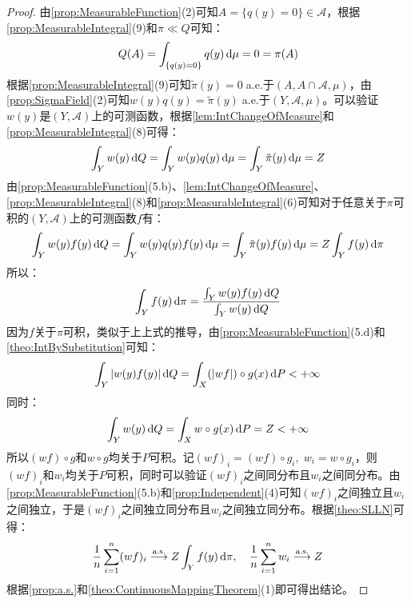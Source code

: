 \begin{proof}
	由\cref{prop:MeasurableFunction}(2)可知$A=\{q(y)=0\}\in\mathscr{A}$，根据\cref{prop:MeasurableIntegral}(9)和$\pi\ll Q$可知：
	\begin{equation*}
		Q(A)=\int_{\{q(y)=0\}}q(y)\mathop{}\!\mathrm{d}\mu=0=\pi(A)
	\end{equation*}
	根据\cref{prop:MeasurableIntegral}(9)可知$\tilde{\pi}(y)=0\;$a.e.于$(A,A\cap\mathscr{A},\mu)$，由\cref{prop:SigmaField}(2)可知$w(y)q(y)=\tilde{\pi}(y)\;$a.e.于$(Y,\mathscr{A},\mu)$。可以验证$w(y)$是$(Y,\mathscr{A})$上的可测函数，根据\cref{lem:IntChangeOfMeasure}和\cref{prop:MeasurableIntegral}(8)可得：
	\begin{equation*}
		\int_{Y}w(y)\mathop{}\!\mathrm{d} Q=\int_{Y}w(y)q(y)\mathop{}\!\mathrm{d}\mu=\int_{Y}\tilde{\pi}(y)\mathop{}\!\mathrm{d}\mu=Z
	\end{equation*}
	由\cref{prop:MeasurableFunction}(5.b)、\cref{lem:IntChangeOfMeasure}、\cref{prop:MeasurableIntegral}(8)和\cref{prop:MeasurableIntegral}(6)可知对于任意关于$\pi$可积的$(Y,\mathscr{A})$上的可测函数$f$有：
	\begin{equation*}
		\int_{Y}w(y)f(y)\mathop{}\!\mathrm{d} Q=\int_{Y}w(y)q(y)f(y)\mathop{}\!\mathrm{d}\mu=\int_{Y}\tilde{\pi}(y)f(y)\mathop{}\!\mathrm{d}\mu=Z\int_{Y}f(y)\mathop{}\!\mathrm{d}\pi
	\end{equation*}
	所以：
	\begin{equation*}
		\int_{Y}f(y)\mathop{}\!\mathrm{d}\pi=\frac{\int_{Y}w(y)f(y)\mathop{}\!\mathrm{d} Q}{\int_{Y}w(y)\mathop{}\!\mathrm{d} Q}
	\end{equation*}
	因为$f$关于$\pi$可积，类似于上上式的推导，由\cref{prop:MeasurableFunction}(5.d)和\cref{theo:IntBySubstitution}可知：
	\begin{align*}
		\int_{Y}|w(y)f(y)|\mathop{}\!\mathrm{d} Q=\int_{X}(|wf|)\circ g(x)\mathop{}\!\mathrm{d} P<+\infty
	\end{align*}
	同时：
	\begin{equation*}
		\int_{Y}w(y)\mathop{}\!\mathrm{d} Q=\int_{X}w\circ g(x)\mathop{}\!\mathrm{d} P=Z<+\infty
	\end{equation*}
	所以$(wf)\circ g$和$w\circ g$均关于$P$可积。记$(wf)_i=(wf)\circ g_i,\;w_i=w\circ g_i$，则$(wf)_i$和$w_i$均关于$P$可积，同时可以验证$(wf)_i$之间同分布且$w_i$之间同分布。由\cref{prop:MeasurableFunction}(5.b)和\cref{prop:Independent}(4)可知$(wf)_i$之间独立且$w_i$之间独立，于是$(wf)_i$之间独立同分布且$w_i$之间独立同分布。根据\cref{theo:SLLN}可得：
	\begin{equation*}
		\frac{1}{n}\sum_{i=1}^{n}(wf)_i\overset{\text{a.s.}}{\longrightarrow}Z\int_{Y}f(y)\mathop{}\!\mathrm{d}\pi,\quad\frac{1}{n}\sum_{i=1}^{n}w_i\overset{\text{a.s.}}{\longrightarrow}Z
	\end{equation*}
	根据\cref{prop:a.s.}和\cref{theo:ContinuousMappingTheorem}(1)即可得出结论。
\end{proof}
